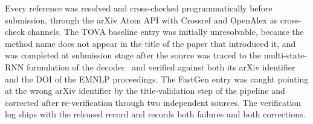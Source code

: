 Every reference was resolved and cross-checked programmatically
before submission, through the arXiv Atom API with Crossref and
OpenAlex as cross-check channels. The TOVA baseline entry was
initially unresolvable, because the method name does not appear in
the title of the paper that introduced it, and was completed at
submission stage after the source was traced to the multi-state-RNN
formulation of the decoder~\cite{oren2024tova} and verified against
both its arXiv identifier and the DOI of the EMNLP proceedings. The
FastGen entry was caught pointing at the wrong arXiv identifier by
the title-validation step of the pipeline and corrected after
re-verification through two independent sources. The verification log
ships with the released record and records both failures and both
corrections.
